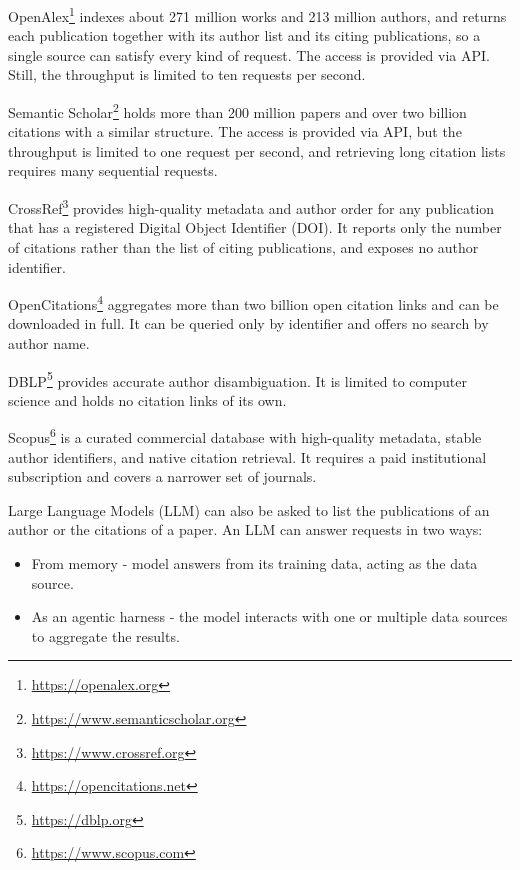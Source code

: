 \begin{description}
    \item \textsf{OpenAlex}\footnote{\url{https://openalex.org}} indexes about 271 million works and 213 million authors, and returns each publication together with its author list and its citing publications, so a single source can satisfy every kind of request.
    The access is provided via API.
    Still, the throughput is limited to ten requests per second.
    \item \textsf{Semantic Scholar}\footnote{\url{https://www.semanticscholar.org}} holds more than 200 million papers and over two billion citations with a similar structure.
    The access is provided via API, but the throughput is limited to one request per second, and retrieving long citation lists requires many sequential requests.
    \item \textsf{CrossRef}\footnote{\url{https://www.crossref.org}} provides high-quality metadata and author order for any publication that has a registered Digital Object Identifier (\textsf{DOI}).
    It reports only the number of citations rather than the list of citing publications, and exposes no author identifier.
    \item \textsf{OpenCitations}\footnote{\url{https://opencitations.net}} aggregates more than two billion open citation links and can be downloaded in full.
    It can be queried only by identifier and offers no search by author name.
    \item \textsf{DBLP}\footnote{\url{https://dblp.org}} provides accurate author disambiguation.
    It is limited to computer science and holds no citation links of its own.
    \item \textsf{Scopus}\footnote{\url{https://www.scopus.com}} is a curated commercial database with high-quality metadata, stable author identifiers, and native citation retrieval.
    It requires a paid institutional subscription and covers a narrower set of journals.
    \item \textsf{Large Language Models} (LLM) can also be asked to list the publications of an author or the citations of a paper.
    An LLM can answer requests in two ways:
    \begin{itemize}
        \item From memory - model answers from its training data, acting as the data source.
        \item As an agentic harness - the model interacts with one or multiple data sources to aggregate the results.
    \end{itemize}
\end{description}


